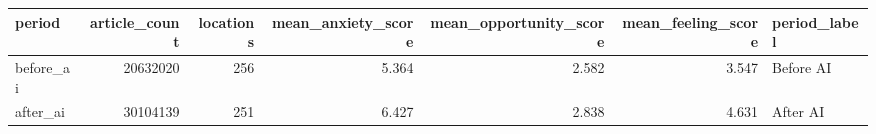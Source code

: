 \begin{tabular}{lrrrrrl}
\toprule
period & article\_count & locations & mean\_anxiety\_score & mean\_opportunity\_score & mean\_feeling\_score & period\_label \\
\midrule
before\_ai & 20632020 & 256 & 5.364 & 2.582 & 3.547 & Before AI \\
after\_ai & 30104139 & 251 & 6.427 & 2.838 & 4.631 & After AI \\
\bottomrule
\end{tabular}
